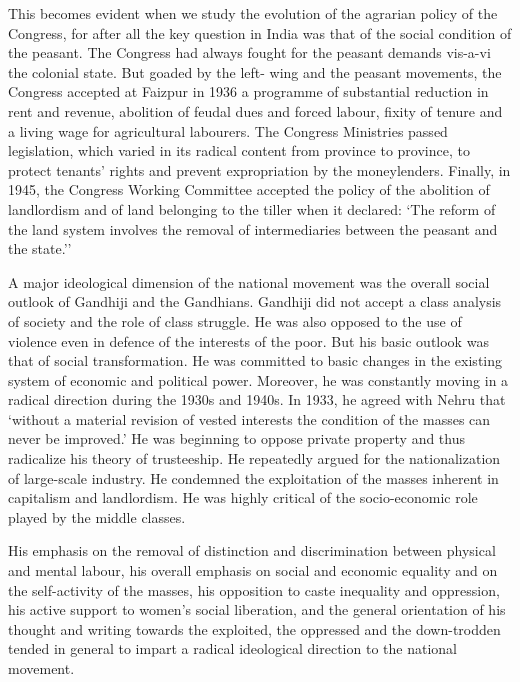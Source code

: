 \begin{multicols}{2}
This becomes evident when we study the evolution of the agrarian policy of the Congress, for after all the key question in India was that of the social condition of the peasant. The Congress had always fought for the peasant demands vis-a-vi the colonial state. But goaded by the left- wing and the peasant movements, the Congress accepted at Faizpur in 1936 a programme of substantial reduction in rent and revenue, abolition of feudal dues and forced labour, fixity of tenure and a living wage for agricultural labourers. The Congress Ministries passed legislation, which varied in its radical content from province to province, to protect tenants' rights and prevent expropriation by the moneylenders. Finally, in 1945, the Congress Working Committee accepted the policy of the abolition of landlordism and of land belonging to the tiller when it declared: `The reform of the land system involves the removal of intermediaries between the peasant and the state.''

A major ideological dimension of the national movement was the overall social outlook of Gandhiji and the Gandhians. Gandhiji did not accept a class analysis of society and the role of class struggle. He was also opposed to the use of violence even in defence of the interests of the poor. But his basic outlook was that of social transformation. He was committed to basic changes in the existing system of economic and political power. Moreover, he was constantly moving in a radical direction during the 1930s and 1940s. In 1933, he agreed with Nehru that `without a material revision of vested interests the condition of the masses can never be improved.' He was beginning to oppose private property and thus radicalize his theory of trusteeship. He repeatedly argued for the nationalization of large-scale industry. He condemned the exploitation of the masses inherent in capitalism and landlordism. He was highly critical of the socio-economic role played by the middle classes.

His emphasis on the removal of distinction and discrimination between physical and mental labour, his overall emphasis on social and economic equality and on the self-activity of the masses, his opposition to caste inequality and oppression, his active support to women's social liberation, and the general orientation of his thought and writing towards the exploited, the oppressed and the down-trodden tended in general to impart a radical ideological direction to the national movement.


\end{multicols}
